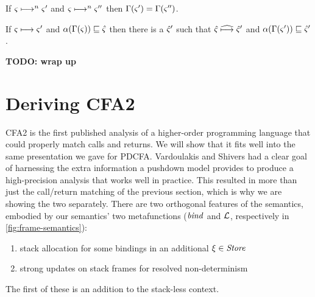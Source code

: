 \begin{theorem}\label{thm:gc-concrete}
  If $\varsigma \longmapsto^n \varsigma'$ and $\varsigma \longmapsto^n \varsigma''$ then $\Gamma(\varsigma') = \Gamma(\varsigma'')$.
\end{theorem}

\begin{theorem}\label{thm:gc-sound}
  If $\varsigma \longmapsto \varsigma'$ and $\alpha(\Gamma(\varsigma)) \sqsubseteq \hat\varsigma$ then there is a $\hat\varsigma'$ such that $\hat\varsigma \mathrel{\widehat{\longmapsto}} \hat\varsigma'$ and $\alpha(\Gamma(\varsigma')) \sqsubseteq \hat\varsigma'$.
\end{theorem}
%
\textbf{TODO: wrap up}

\section{Deriving CFA2}
\label{sec:cfa2}

CFA2 is the first published analysis of a higher-order programming language that could properly match calls and returns.
%
We will show that it fits well into the same presentation we gave for PDCFA.
%
Vardoulakis and Shivers had a clear goal of harnessing the extra information a pushdown model provides to produce a high-precision analysis that works well in practice.
%
This resulted in more than just the call/return matching of the previous section, which is why we are showing the two separately.
%
There are two orthogonal features of the semantics, embodied by our semantics' two metafunctions ($\mathit{bind}$ and ${\mathcal L}$, respectively in \autoref{fig:frame-semantics}):
\begin{enumerate}
\item{stack allocation for some bindings in an additional $\xi \in \mathit{Store}$}
\item{strong updates on stack frames for resolved non-determinism}
\end{enumerate}
The first of these is an addition to the stack-less context.

